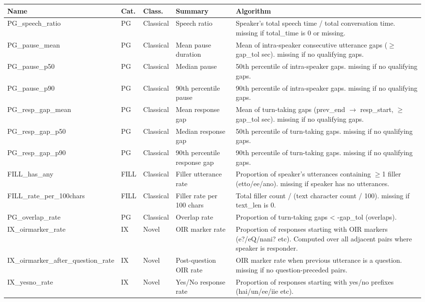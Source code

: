 {\footnotesize
\begin{longtable}{lllp{2.5cm}p{4.5cm}}
\toprule
Name & Cat. & Class. & Summary & Algorithm \\
\midrule
\endhead
PG\_speech\_ratio & PG & Classical & Speech ratio & Speaker's total speech time / total conversation time. missing if total\_time is 0 or missing. \\
PG\_pause\_mean & PG & Classical & Mean pause duration & Mean of intra-speaker consecutive utterance gaps ($\geq$gap\_tol sec). missing if no qualifying gaps. \\
PG\_pause\_p50 & PG & Classical & Median pause & 50th percentile of intra-speaker gaps. missing if no qualifying gaps. \\
PG\_pause\_p90 & PG & Classical & 90th percentile pause & 90th percentile of intra-speaker gaps. missing if no qualifying gaps. \\
PG\_resp\_gap\_mean & PG & Classical & Mean response gap & Mean of turn-taking gaps (prev\_end $\rightarrow$ resp\_start, $\geq$gap\_tol sec). missing if no qualifying gaps. \\
PG\_resp\_gap\_p50 & PG & Classical & Median response gap & 50th percentile of turn-taking gaps. missing if no qualifying gaps. \\
PG\_resp\_gap\_p90 & PG & Classical & 90th percentile response gap & 90th percentile of turn-taking gaps. missing if no qualifying gaps. \\
FILL\_has\_any & FILL & Classical & Filler utterance rate & Proportion of speaker's utterances containing $\geq$1 filler (etto/ee/ano). missing if speaker has no utterances. \\
FILL\_rate\_per\_100chars & FILL & Classical & Filler rate per 100 chars & Total filler count / (text character count / 100). missing if text\_len is 0. \\
PG\_overlap\_rate & PG & Classical & Overlap rate & Proportion of turn-taking gaps < -gap\_tol (overlaps). \\
IX\_oirmarker\_rate & IX & Novel & OIR marker rate & Proportion of responses starting with OIR markers (e?/eQ/nani? etc). Computed over all adjacent pairs where speaker is responder. \\
IX\_oirmarker\_after\_question\_rate & IX & Novel & Post-question OIR rate & OIR marker rate when previous utterance is a question. missing if no question-preceded pairs. \\
IX\_yesno\_rate & IX & Novel & Yes/No response rate & Proportion of responses starting with yes/no prefixes (hai/un/ee/iie etc). \\

\end{longtable}}
